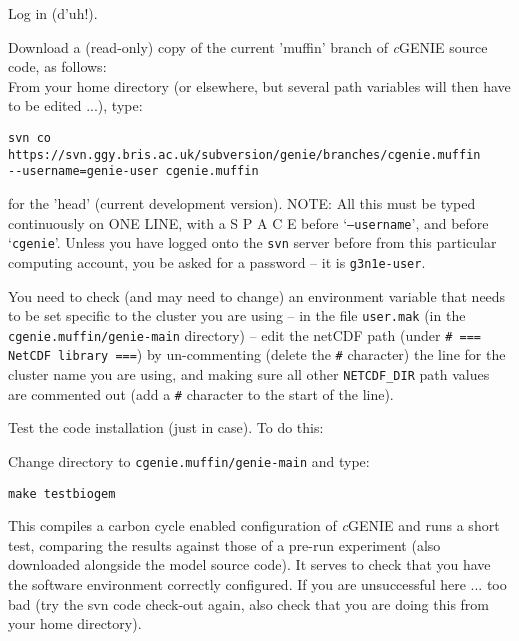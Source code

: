 \documentclass[10pt,twoside]{article}
\begin{document}
\begin{compactenum}
\item Log in (d'uh!).
\item Download a (read-only) copy of the current 'muffin' branch of \textit{c}GENIE source code, as follows:
\\ From your home directory (or elsewhere, but several path variables will then have to be edited ...), type:
\vspace{-5pt}\begin{verbatim}
svn co https://svn.ggy.bris.ac.uk/subversion/genie/branches/cgenie.muffin
--username=genie-user cgenie.muffin
\end{verbatim}\vspace{-5pt}
for the 'head' (current development version).
NOTE: All this must be typed continuously on ONE LINE, with a S P A C E before `\texttt{--username}', and before `\texttt{cgenie}'.
Unless you have logged onto the \texttt{svn} server before from this particular computing account, you be asked for a password -- it is \texttt{g3n1e-user}.

\item   You need to check (and may need to change) an environment variable that needs to be set specific to the cluster you are using -- in the file \texttt{user.mak} (in the \texttt{cgenie.muffin/genie-main} directory) -- edit the netCDF path (under \texttt{\# === NetCDF library ===}) by un-commenting (delete the \texttt{\#} character) the line for the cluster name you are using, and making sure all other \texttt{NETCDF\_DIR} path values are commented out (add a \texttt{\#} character to the start of the line).

\item   Test the code installation (just in case). To do this:

Change directory to \texttt{cgenie.muffin/genie-main} and type:
\vspace{-5pt}\begin{verbatim}
make testbiogem
\end{verbatim}\vspace{-5pt}
This compiles a carbon cycle enabled configuration of \textit{c}GENIE and runs a short test, comparing the results against those of a pre-run experiment (also downloaded alongside the model source code). It serves to check that you have the software environment correctly configured. If you are unsuccessful here ... too bad (try the svn code check-out again, also check that you are doing this from your home directory).

\end{compactenum}
\end{document}
